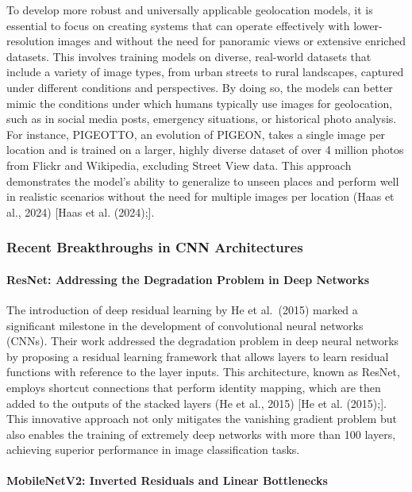 To develop more robust and universally applicable geolocation models, it
is essential to focus on creating systems that can operate effectively
with lower-resolution images and without the need for panoramic views or
extensive enriched datasets. This involves training models on diverse,
real-world datasets that include a variety of image types, from urban
streets to rural landscapes, captured under different conditions and
perspectives. By doing so, the models can better mimic the conditions
under which humans typically use images for geolocation, such as in
social media posts, emergency situations, or historical photo analysis.
For instance, PIGEOTTO, an evolution of PIGEON, takes a single image per
location and is trained on a larger, highly diverse dataset of over 4
million photos from Flickr and Wikipedia, excluding Street View data.
This approach demonstrates the model's ability to generalize to unseen
places and perform well in realistic scenarios without the need for
multiple images per location (Haas et al., 2024) {[}Haas et al.
(2024);{]}.

\subsubsection{Recent Breakthroughs in CNN
Architectures}\label{recent-breakthroughs-in-cnn-architectures}

\paragraph{ResNet: Addressing the Degradation Problem in Deep
Networks}\label{resnet-addressing-the-degradation-problem-in-deep-networks}

The introduction of deep residual learning by He et al.~(2015) marked a
significant milestone in the development of convolutional neural
networks (CNNs). Their work addressed the degradation problem in deep
neural networks by proposing a residual learning framework that allows
layers to learn residual functions with reference to the layer inputs.
This architecture, known as ResNet, employs shortcut connections that
perform identity mapping, which are then added to the outputs of the
stacked layers (He et al., 2015) {[}He et al. (2015);{]}. This
innovative approach not only mitigates the vanishing gradient problem
but also enables the training of extremely deep networks with more than
100 layers, achieving superior performance in image classification
tasks.

\paragraph{MobileNetV2: Inverted Residuals and Linear
Bottlenecks}\label{mobilenetv2-inverted-residuals-and-linear-bottlenecks}

